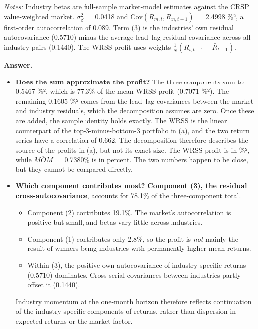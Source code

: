 \documentclass[11pt]{article}
\begin{document}
\emph{Notes:} Industry betas are full-sample market-model estimates against the CRSP value-weighted market. $\sigma^2_\beta=$ 0.0418 and $\mathrm{Cov}(R_{m,t},R_{m,t-1})=$ 2.4998 \%², a first-order autocorrelation of 0.089. Term (3) is the industries' own residual autocovariance (0.5710) minus the average lead–lag residual covariance across all industry pairs (0.1440). The WRSS profit uses weights $\frac{1}{N}(R_{i,t-1}-\bar R_{t-1})$.
 
\textbf{Answer.}
 
\begin{itemize}
  \item \textbf{Does the sum approximate the profit?} The three components sum to 0.5467 \%², which is 77.3\% of the mean WRSS profit (0.7071 \%²). The remaining 0.1605 \%² comes from the lead–lag covariances between the market and industry residuals, which the decomposition assumes are zero. Once these are added, the sample identity holds exactly. The WRSS is the linear counterpart of the top-3-minus-bottom-3 portfolio in (a), and the two return series have a correlation of 0.662. The decomposition therefore describes the source of the profits in (a), but not its exact size. The WRSS profit is in \%², while $\overline{MOM}=$ 0.7380\% is in percent. The two numbers happen to be close, but they cannot be compared directly.
  \item \textbf{Which component contributes most?} \textbf{Component (3), the residual cross-autocovariance}, accounts for 78.1\% of the three-component total.
  \begin{itemize}
    \item Component (2) contributes 19.1\%. The market's autocorrelation is positive but small, and betas vary little across industries.
    \item Component (1) contributes only 2.8\%, so the profit is \emph{not} mainly the result of winners being industries with permanently higher mean returns.
    \item Within (3), the positive own autocovariance of industry-specific returns (0.5710) dominates. Cross-serial covariances between industries partly offset it (0.1440).
  \end{itemize}
 
  Industry momentum at the one-month horizon therefore reflects continuation of the industry-specific components of returns, rather than dispersion in expected returns or the market factor.
\end{itemize}
 
\end{document}

